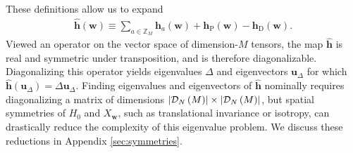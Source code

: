 \documentclass[nofootinbib,notitlepage,11pt]{revtex4-2}
\renewcommand{\t}{\text} %
\newcommand{\p}[1]{\left(#1\right)} %
\newcommand{\m}{\bm} %
\newcommand{\1}{\mathds{1}}
\newcommand{\D}{\mathcal{D}}
\newcommand{\ZZ}{\mathbb{Z}}
\begin{document}
These definitions allow us to expand
\begin{align}
  \hat{\m h}\p{\m w}
  \equiv \sum_{a\in\ZZ_M} \m h_a\p{\m w}
  + \m h_{\t{P}}\p{\m w} - \m h_{\t{D}}\p{\m w}.
  \label{eq:multi_body_op}
\end{align}
Viewed an operator on the vector space of dimension-$M$ tensors, the
map $\hat{\m h}$ is real and symmetric under transposition, and is
therefore diagonalizable.  Diagonalizing this operator yields
eigenvalues $\Delta$ and eigenvectors $\m u_\Delta$ for which
$\hat{\m h}\p{\m u_\Delta}=\Delta\m u_\Delta$.  Finding eigenvalues
and eigenvectors of $\hat{\m h}$ nominally requires diagonalizing a
matrix of dimensions $\abs{\D_N\p{M}}\times\abs{\D_N\p{M}}$, but
spatial symmetries of $H_0$ and $X_{\m w}$, such as translational
invariance or isotropy, can drastically reduce the complexity of this
eigenvalue problem.  We discuss these reductions in Appendix
\ref{sec:symmetries}.
\end{document}
